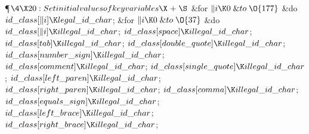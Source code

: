 \Y\P$\4\X20:Set initial values of key variables\X\mathrel{+}\S$\6
\&{for} $\|i\K0\mathrel{\&{to}}\O{177}$ \1\&{do}\5
$\\{id\_class}[\|i]\K\\{legal\_id\_char}$;\2\6
\&{for} $\|i\K0\mathrel{\&{to}}\O{37}$ \1\&{do}\5
$\\{id\_class}[\|i]\K\\{illegal\_id\_char}$;\2\6
$\\{id\_class}[\\{space}]\K\\{illegal\_id\_char}$;\5
$\\{id\_class}[\\{tab}]\K\\{illegal\_id\_char}$;\5
$\\{id\_class}[\\{double\_quote}]\K\\{illegal\_id\_char}$;\5
$\\{id\_class}[\\{number\_sign}]\K\\{illegal\_id\_char}$;\5
$\\{id\_class}[\\{comment}]\K\\{illegal\_id\_char}$;\5
$\\{id\_class}[\\{single\_quote}]\K\\{illegal\_id\_char}$;\5
$\\{id\_class}[\\{left\_paren}]\K\\{illegal\_id\_char}$;\5
$\\{id\_class}[\\{right\_paren}]\K\\{illegal\_id\_char}$;\5
$\\{id\_class}[\\{comma}]\K\\{illegal\_id\_char}$;\5
$\\{id\_class}[\\{equals\_sign}]\K\\{illegal\_id\_char}$;\5
$\\{id\_class}[\\{left\_brace}]\K\\{illegal\_id\_char}$;\5
$\\{id\_class}[\\{right\_brace}]\K\\{illegal\_id\_char}$;\par
\fi

